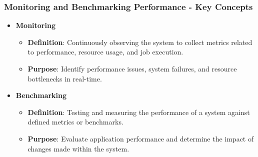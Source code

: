 \documentclass{beamer}
\begin{document}
\begin{frame}[fragile]
    \frametitle{Monitoring and Benchmarking Performance - Key Concepts}
    \begin{itemize}
        \item \textbf{Monitoring}
            \begin{itemize}
                \item \textbf{Definition}: Continuously observing the system to collect metrics related to performance, resource usage, and job execution.
                \item \textbf{Purpose}: Identify performance issues, system failures, and resource bottlenecks in real-time.
            \end{itemize}
          
        \item \textbf{Benchmarking}
            \begin{itemize}
                \item \textbf{Definition}: Testing and measuring the performance of a system against defined metrics or benchmarks.
                \item \textbf{Purpose}: Evaluate application performance and determine the impact of changes made within the system.
            \end{itemize}
    \end{itemize}
\end{frame}
\end{document}

